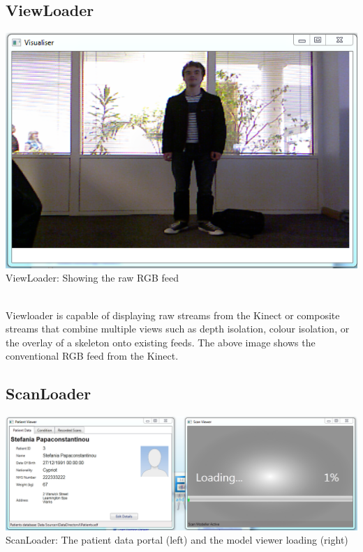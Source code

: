 \subsection{ViewLoader}

\begin{center}
    \includegraphics[scale=0.5]{zscreenshots/rgbvisualiser.PNG} \\
    \caption{ViewLoader: Showing the raw RGB feed}
\end{center} \\

Viewloader is capable of displaying raw streams from the Kinect or composite streams that combine multiple views such as depth isolation, colour isolation, or the overlay of a skeleton onto existing feeds. The above image shows the conventional RGB feed from the Kinect. \\

\subsection{ScanLoader}

\begin{center}
    \includegraphics[scale=0.3]{zscreenshots/patientloading.png} \\
    \caption{ScanLoader: The patient data portal (left) and the model viewer loading (right)}
\end{center} \\

